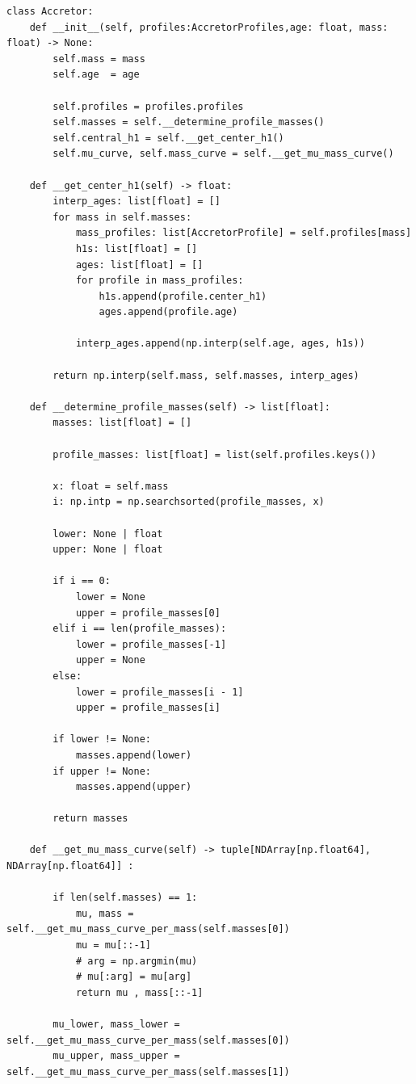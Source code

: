 \documentclass[a4paper,10pt]{article}
\begin{document}
\nextpage
\begin{verbatim}
class Accretor:
    def __init__(self, profiles:AccretorProfiles,age: float, mass: float) -> None:
        self.mass = mass
        self.age  = age

        self.profiles = profiles.profiles
        self.masses = self.__determine_profile_masses()
        self.central_h1 = self.__get_center_h1()
        self.mu_curve, self.mass_curve = self.__get_mu_mass_curve()
    
    def __get_center_h1(self) -> float:
        interp_ages: list[float] = []
        for mass in self.masses:
            mass_profiles: list[AccretorProfile] = self.profiles[mass]
            h1s: list[float] = []
            ages: list[float] = []
            for profile in mass_profiles:
                h1s.append(profile.center_h1)
                ages.append(profile.age)

            interp_ages.append(np.interp(self.age, ages, h1s))

        return np.interp(self.mass, self.masses, interp_ages)

    def __determine_profile_masses(self) -> list[float]:
        masses: list[float] = []

        profile_masses: list[float] = list(self.profiles.keys())

        x: float = self.mass
        i: np.intp = np.searchsorted(profile_masses, x)

        lower: None | float
        upper: None | float

        if i == 0:
            lower = None
            upper = profile_masses[0]
        elif i == len(profile_masses):
            lower = profile_masses[-1]
            upper = None
        else:
            lower = profile_masses[i - 1]
            upper = profile_masses[i]

        if lower != None:
            masses.append(lower)
        if upper != None:
            masses.append(upper)

        return masses

    def __get_mu_mass_curve(self) -> tuple[NDArray[np.float64], NDArray[np.float64]] :

        if len(self.masses) == 1:
            mu, mass = self.__get_mu_mass_curve_per_mass(self.masses[0])
            mu = mu[::-1]
            # arg = np.argmin(mu)
            # mu[:arg] = mu[arg]
            return mu , mass[::-1]

        mu_lower, mass_lower = self.__get_mu_mass_curve_per_mass(self.masses[0])
        mu_upper, mass_upper = self.__get_mu_mass_curve_per_mass(self.masses[1])


\end{verbatim}
\end{document}
